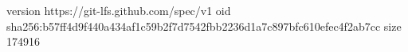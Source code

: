 version https://git-lfs.github.com/spec/v1
oid sha256:b57ff4d9f440a434af1c59b2f7d7542fbb2236d1a7c897bfc610efec4f2ab7cc
size 174916
